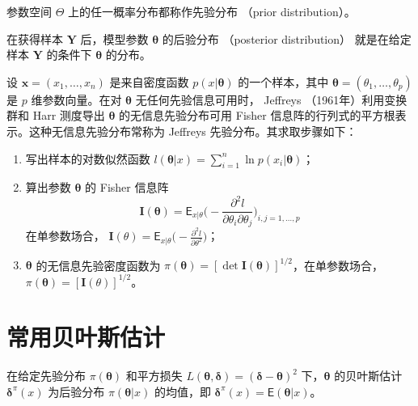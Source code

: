 \documentclass[12pt,a4paper,UTF8,twoside]{book}
\providecommand{\tightlist}{%
  \setlength{\itemsep}{0pt}\setlength{\parskip}{0pt}}
\theoremstyle{definition}
\theoremstyle{definition}
\theoremstyle{definition}
\theoremstyle{remark}
\let\BeginKnitrBlock\begin \let\EndKnitrBlock\end
\begin{document}
\BeginKnitrBlock{definition}[先验分布]
\protect\hypertarget{def:prior-distribution}{}{\label{def:prior-distribution}
{} }参数空间 \(\Theta\)
上的任一概率分布都称作先验分布 （prior distribution）。
\EndKnitrBlock{definition}

\BeginKnitrBlock{definition}[后验分布]
\protect\hypertarget{def:posterior-distribution}{}{\label{def:posterior-distribution}
{} }在获得样本 \(\mathbf{Y}\) 后，模型参数
\(\boldsymbol{\theta}\) 的后验分布 （posterior distribution）
就是在给定样本 \(\mathbf{Y}\) 的条件下 \(\boldsymbol{\theta}\) 的分布。
\EndKnitrBlock{definition}

\BeginKnitrBlock{definition}[Jeffreys 先验分布]
\protect\hypertarget{def:Jeffreys-prior-distribution}{}{\label{def:Jeffreys-prior-distribution}
{} }设 \(\mathbf{x} = (x_1,\ldots,x_n)\)
是来自密度函数 \(p(x|\boldsymbol{\theta})\) 的一个样本，其中
\(\boldsymbol{\theta} = (\theta_1,\ldots,\theta_p)\) 是 \(p\)
维参数向量。在对 \(\boldsymbol{\theta}\) 无任何先验信息可用时， Jeffreys
（1961年）利用变换群和 Harr 测度导出 \(\boldsymbol{\theta}\)
的无信息先验分布可用 Fisher
信息阵的行列式的平方根表示。这种无信息先验分布常称为 Jeffreys
先验分布。其求取步骤如下：
\EndKnitrBlock{definition}

\begin{enumerate}
\def\labelenumi{\arabic{enumi}.}
\tightlist
\item
  写出样本的对数似然函数
  \(l(\boldsymbol{\theta}|x) = \sum_{i=1}^{n}\ln p(x_i | \boldsymbol{\theta})\)；
\item
  算出参数 \(\boldsymbol{\theta}\) 的 Fisher 信息阵
  \[\mathbf{I}(\boldsymbol{\theta}) = \mathsf{E}_{x|\theta} \big( - \frac{\partial^2 l}{\partial \theta_i \partial \theta_j} \big)_{i,j=1,\ldots,p}\]
  在单参数场合，
  \(\mathbf{I}(\theta) = \mathsf{E}_{x|\theta} \big( - \frac{\partial^2 l}{\partial \theta^2} \big)\)；
\item
  \(\boldsymbol{\theta}\) 的无信息先验密度函数为
  \(\pi(\boldsymbol{\theta}) = [\det \mathbf{I}(\boldsymbol{\theta}) ]^{1/2}\)，在单参数场合，
  \(\pi(\boldsymbol{\theta}) = [\mathbf{I}(\theta) ]^{1/2}\)。
\end{enumerate}

\hypertarget{bayes-estimates}{%
\section{常用贝叶斯估计}\label{bayes-estimates}}

\BeginKnitrBlock{theorem}[平方损失]
\protect\hypertarget{thm:bayes-estimate-square}{}{\label{thm:bayes-estimate-square}
{} }在给定先验分布 \(\pi(\boldsymbol{\theta})\)
和平方损失
\(L(\boldsymbol{\theta},\boldsymbol{\delta}) = (\boldsymbol{\delta} - \boldsymbol{\theta})^2\)
下，\(\boldsymbol{\theta}\) 的贝叶斯估计
\(\boldsymbol{\delta}^{\pi}(x)\) 为后验分布
\(\pi(\boldsymbol{\theta}|x)\) 的均值，即
\(\boldsymbol{\delta}^{\pi}(x) = \mathsf{E}(\boldsymbol{\theta}|x)\)。
\EndKnitrBlock{theorem}
\end{document}

